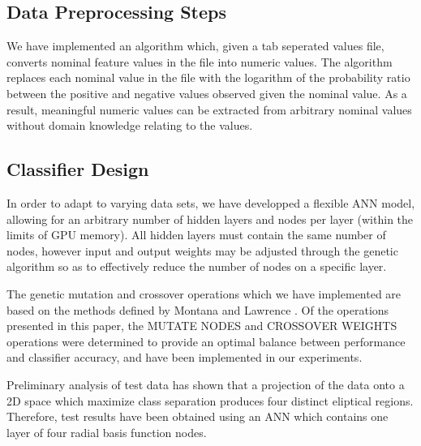 \documentclass[11pt]{article}       %
\begin{document}
\subsection{Data Preprocessing Steps} \label{preprocessing}
We have implemented an algorithm which, given a tab seperated values file, converts nominal feature values in the file into numeric values.  The algorithm replaces each nominal value in the file with the logarithm of the probability ratio between the positive and negative values observed given the nominal value.  As a result, meaningful numeric values can be extracted from arbitrary nominal values without domain knowledge relating to the values.

\subsection{Classifier Design} \label{design}
In order to adapt to varying data sets, we have developped a flexible ANN model, allowing for an arbitrary number of hidden layers and nodes per layer (within the limits of GPU memory). All hidden layers must contain the same number of nodes, however input and output weights may be adjusted through the genetic algorithm so as to effectively reduce the number of nodes on a specific layer.

The genetic mutation and crossover operations which we have implemented are based on the methods defined by Montana and Lawrence \cite{GA-ANN}. Of the operations presented in this paper, the MUTATE NODES and CROSSOVER WEIGHTS operations were determined to provide an optimal balance between performance and classifier accuracy, and have been implemented in our experiments.

Preliminary analysis of test data has shown that a projection of the data onto a 2D space which maximize class separation produces four distinct eliptical regions.  Therefore, test results have been obtained using an ANN which contains one layer of four radial basis function nodes.


\end{document}

